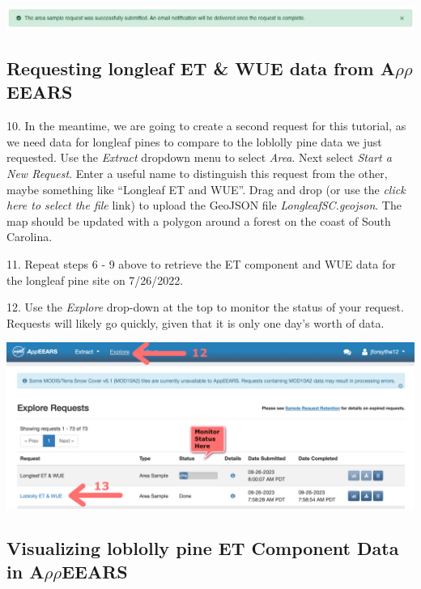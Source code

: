 \documentclass[oneside,a4paper,11pt,explicit]{book}
\begin{document}
\vspace{.5em}

\centerline{\includegraphics[width=\textwidth]{RequestSuccess.png}}

\subsection{Requesting longleaf ET \& WUE data from A$\rho\rho$EEARS}

10. In the meantime, we are going to create a second request for this tutorial, as we need data for longleaf pines to compare to the loblolly pine data we just requested. Use the \textit{Extract} dropdown menu to select \textit{Area}. Next select \textit{Start a New Request}.  Enter a useful name to distinguish this request from the other, maybe something like ``Longleaf ET and WUE''. Drag and drop (or use the \textit{click here to select the file} link) to upload the GeoJSON file \textit{LongleafSC.geojson}. The map should be updated with a polygon around a forest on the coast of South Carolina.

11. Repeat steps 6 - 9 above to retrieve the ET component and WUE data for the longleaf pine site on 7/26/2022.




12. Use the \textit{Explore} drop-down at the top to monitor the status of your request. Requests will likely go quickly, given that it is only one day's worth of data.

\vspace{.5em}

\centerline{\includegraphics[width=.55\textwidth]{ExploreComplete.png}}

\vspace{.5em}

\subsection{Visualizing loblolly pine ET Component Data in A$\rho\rho$EEARS}
\end{document}
